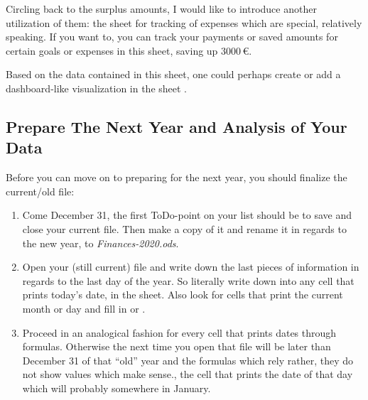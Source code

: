 Circling back to the surplus amounts, I would like to introduce another utilization of them: the sheet for tracking of expenses which are special, relatively speaking.
If you want to, you can track your payments or saved amounts for certain goals or expenses in this sheet, \ie saving up 3000\,€.

Based on the data contained in this sheet, one could perhaps create or add a dashboard-like visualization in the sheet .


\subsection{Prepare The Next Year and Analysis of Your Data}
\label{subsec:prepare-the-next-year-analysis}

Before you can move on to preparing \tfn for the next year, you should finalize the current/old file:
\begin{enumerate}
	\item Come December 31, the first ToDo-point on your list should be to save and close your current file.
	Then make a copy of it and rename it in regards to the new year, \eg to \emph{Finances-2020.ods}.
	\item Open your (still current) file and write down the last pieces of information in regards to the last day of the year.
	So literally write down  into any cell that prints today's date, \eg in the  sheet.
	Also look for cells that print the current month or day and fill in  or .
	\item Proceed in an analogical fashion for every cell that prints dates through formulas.
	Otherwise the next time you open that file will be later than December 31 of that ``old'' year and the formulas which rely rather, they do not show values which make sense., the cell that prints the date of that day which will probably somewhere in January.
\end{enumerate}

